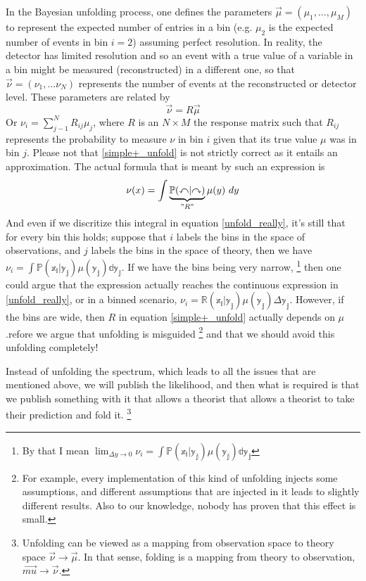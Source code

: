 In the Bayesian unfolding process, one defines the parameters $\vec{\mu}=\left(\mu_{1}, \ldots, \mu_{M}\right)$ to represent the expected number of entries in a bin (e.g. $\mu_2$ is the expected number of events in bin $i=2$) assuming perfect resolution. In reality, the detector has limited resolution and so an event with a true value of a variable in a bin might be measured (reconstructed) in a different one, so that $\vec{\nu}=\left(\nu_{1}, \ldots \nu_{N}\right)$ represents the number of events at the reconstructed or detector level. These parameters are related by 
\begin{equation}
    \vec{\nu}=R \vec{\mu}
    \label{simple+_unfold}
\end{equation}
Or $\nu_i = \sum_{j-1}^{N} R_{ij} \mu_j$, where $R$ is an $N\times M$ the response matrix such that $R_{ij}$ represents the probability to measure $\nu$ in bin $i$ given that its true value $\mu$ was in bin $j$. Please not that \ref{simple+_unfold} is not strictly correct as it entails an approximation. The actual formula that is meant by such an expression is 
\begin{equation}
    \nu(x) = \int \underbrace{\mathbb{P(x|y)}}_{"R"} \mu(y) \ dy
    \label{unfold_really}
\end{equation}
And even if we discritize this integral in equation \ref{unfold_really}, it's still that for every bin this holds; suppose that $i$ labels the bins in the space of observations, and $j$ labels the bins in the space of theory, then we have $\nu_i = \int \mathbb{P(x_i|y_j) \mu (y_j) dy_j}$. If we have the bins being very narrow,
\footnote{By that I mean $\lim_{\Delta y \to 0} \nu_i = \int \mathbb{P(x_i|y_j) \mu (y_j) dy_j}$}
then one could argue that the expression actually reaches the continuous expression in \ref{unfold_really}, or in a binned scenario, $\nu_i =  \mathbb{R(x_i|y_j) \mu (y_j)  \Delta y_j}$. However, if the bins are wide, then $R$ in equation \ref{simple+_unfold} actually depends on $\mu$.refore we argue that unfolding is misguided \footnote{For example, every implementation of this kind of unfolding injects some assumptions, and different assumptions that are injected in it leads to slightly different results. Also to our knowledge, nobody has proven that this effect is small.} and that we should avoid this unfolding completely!

Instead of unfolding the spectrum, which leads to all the issues that are mentioned above, we will publish the likelihood, and then what is required is that we publish something with it that allows a theorist that allows a theorist to take their prediction and fold it.
\footnote{Unfolding can be viewed as a mapping from observation space to theory space $\vec{\nu} \rightarrow \vec{\mu}$. In that sense, folding is a mapping from theory to observation, $\vec{mu} \rightarrow \vec{\nu}$.}
